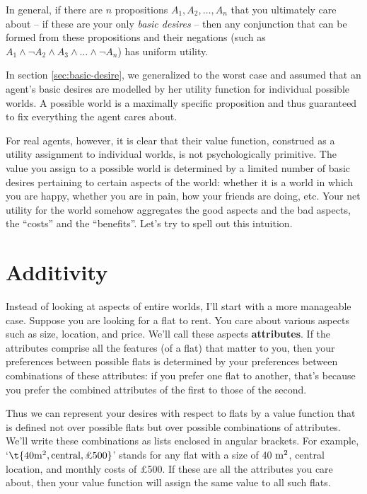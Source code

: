 In general, if there are $n$ propositions $A_1,A_2,\ldots,A_n$ that you
ultimately care about -- if these are your only \emph{basic desires}
-- then any conjunction that can be formed from these propositions and
their negations (such as $A_1 \land \neg A_2 \land A_3 \land \ldots
\land \neg A_n$) has uniform utility.

In section \ref{sec:basic-desire}, we generalized to the worst case
and assumed that an agent's basic desires are modelled by her utility
function for individual possible worlds. A possible world is a
maximally specific proposition and thus guaranteed to fix everything
the agent cares about.

For real agents, however, it is clear that their value function,
construed as a utility assignment to individual worlds, is not
psychologically primitive. The value you assign to a possible world is
determined by a limited number of basic desires pertaining to certain
aspects of the world: whether it is a world in which you are happy,
whether you are in pain, how your friends are doing, etc. Your net
utility for the world somehow aggregates the good aspects and the bad
aspects, the ``costs'' and the ``benefits''. Let's try to spell out
this intuition.

\section{Additivity}\label{sec:additivity}

Instead of looking at aspects of entire worlds, I'll start with a more
manageable case. Suppose you are looking for a flat to rent. You care
about various aspects such as size, location, and price. We'll call
these aspects \textbf{attributes}. If the attributes comprise all the
features (of a flat) that matter to you, then your preferences between
possible flats is determined by your preferences between combinations
of these attributes: if you prefer one flat to another, that's because
you prefer the combined attributes of the first to those of the
second.

Thus we can represent your desires with respect to flats by a value
function that is defined not over possible flats but over possible
combinations of attributes. We'll write these combinations as lists
enclosed in angular brackets. For example, `$\t{40 \m^2,
  \text{central}, \text{£500}}$' stands for any flat with a size of 40
$\text{m}^2$, central location, and monthly costs of £500. If these are all
the attributes you care about, then your value function will assign
the same value to all such flats.

